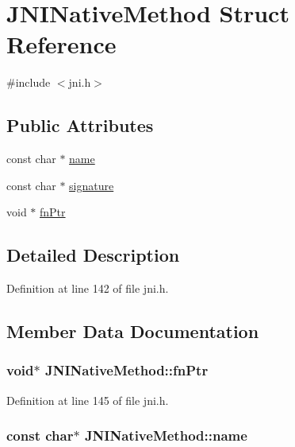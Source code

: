 \hypertarget{struct_j_n_i_native_method}{\section{J\-N\-I\-Native\-Method Struct Reference}
\label{struct_j_n_i_native_method}
}


{\ttfamily \#include $<$jni.\-h$>$}

\subsection*{Public Attributes}
\begin{DoxyCompactItemize}
\item 
const char $\ast$ \hyperlink{struct_j_n_i_native_method_a054c5cbf5a97ea9cbb1c42949a163fa7}{name}
\item 
const char $\ast$ \hyperlink{struct_j_n_i_native_method_ad6d2e4d24ce0971f17259960d9f1d536}{signature}
\item 
void $\ast$ \hyperlink{struct_j_n_i_native_method_aa7f45aa7f42adb48cfdaea1ea73c1311}{fn\-Ptr}
\end{DoxyCompactItemize}


\subsection{Detailed Description}


Definition at line 142 of file jni.\-h.



\subsection{Member Data Documentation}
\hypertarget{struct_j_n_i_native_method_aa7f45aa7f42adb48cfdaea1ea73c1311}{
\subsubsection[{fn\-Ptr}]{\setlength{\rightskip}{0pt plus 5cm}void$\ast$ J\-N\-I\-Native\-Method\-::fn\-Ptr}}\label{struct_j_n_i_native_method_aa7f45aa7f42adb48cfdaea1ea73c1311}


Definition at line 145 of file jni.\-h.

\hypertarget{struct_j_n_i_native_method_a054c5cbf5a97ea9cbb1c42949a163fa7}{
\subsubsection[{name}]{\setlength{\rightskip}{0pt plus 5cm}const char$\ast$ J\-N\-I\-Native\-Method\-::name}}\label{struct_j_n_i_native_method_a054c5cbf5a97ea9cbb1c42949a163fa7}


